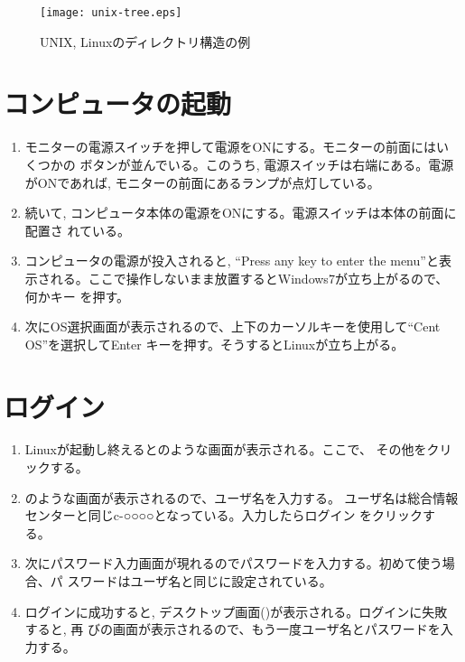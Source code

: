 \begin{figure}[htbp]
\begin{center}
\texttt{[image: unix-tree.eps]}
\caption{UNIX, Linuxのディレクトリ構造の例}
\label{fig:unix-tree}
\end{center}
\end{figure}

\section{コンピュータの起動}

\begin{enumerate}
\item モニターの電源スイッチを押して電源をONにする。モニターの前面にはいくつかの
ボタンが並んでいる。このうち, 電源スイッチは右端にある。電源がONであれば,
モニターの前面にあるランプが点灯している。
\item 続いて, コンピュータ本体の電源をONにする。電源スイッチは本体の前面に配置さ
れている。
\item コンピュータの電源が投入されると, ``Press any key to enter the menu''と表
      示される。ここで操作しないまま放置するとWindows7が立ち上がるので、何かキー
      を押す。
\item 次にOS選択画面が表示されるので、上下のカーソルキーを使用して``Cent OS''を選択してEnter
      キーを押す。そうするとLinuxが立ち上がる。
\end{enumerate}

\section{ログイン}

\begin{enumerate}
\item Linuxが起動し終えるとのような画面が表示される。ここで、
      その他をクリックする。
\item {}のような画面が表示されるので、ユーザ名を入力する。
      ユーザ名は総合情報センターと同じc-○○○○となっている。入力したらログイン
      をクリックする。
\item 次にパスワード入力画面が現れるのでパスワードを入力する。初めて使う場合、パ
      スワードはユーザ名と同じに設定されている。
\item ログインに成功すると, デスクトップ画面()が表示される。ログインに失敗すると, 再
びの画面が表示されるので、もう一度ユーザ名とパスワードを入力する。
\end{enumerate}

